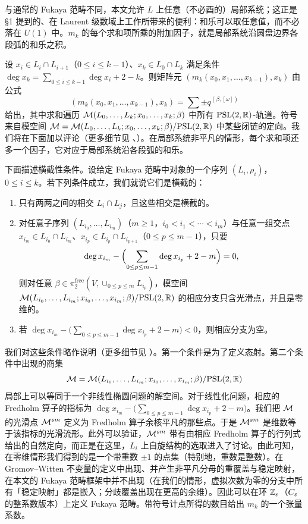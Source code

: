 \begin{yizhu}[局部系统与和乐因子]
与通常的 Fukaya 范畴不同，本文允许 $L$ 上任意（不必酉的）局部系统；这正是 \S1 提到的、在 Laurent 级数域上工作所带来的便利：和乐可以取任意值，而不必落在 $U(1)$ 中。$m_k$ 的每个求和项所乘的附加因子，就是局部系统沿圆盘边界各段弧的和乐之积。
\end{yizhu}

设 $x_i\in L_i\cap L_{i+1}$（$0\le i\le k-1$）、$x_k\in L_0\cap L_k$ 满足条件 $\deg x_k=\sum_{0\le i\le k-1}\deg x_i+2-k$。则矩阵元 $(m_k(x_0,x_1,\dots,x_{k-1}),x_k)$ 由公式
\[
  (m_k(x_0,x_1,\dots,x_{k-1}),x_k)=\sum\pm q^{(\beta,[\omega])}
\]
给出，其中求和遍历 $\mathcal{M}(L_0,\dots,L_k;x_0,\dots,x_k;\beta)$ 中所有 $\mathrm{PSL}(2,\mathbb{R})$-轨道。符号来自模空间 $\mathcal{M}=\mathcal{M}(L_0,\dots,L_k;x_0,\dots,x_k;\beta)/\mathrm{PSL}(2,\mathbb{R})$ 中某些闭链的定向。我们将在下面加以评论（更多细节见 \cite{Fu1}、\cite{FuOOO}）。在局部系统非平凡的情形，每个求和项还多一个因子，它对应于局部系统沿各段弧的和乐。

下面描述横截性条件。设给定 Fukaya 范畴中对象的一个序列 $(L_i,\rho_i)$，$0\le i\le k$。若下列条件成立，我们就说它们是横截的：
\begin{enumerate}[label=\arabic*),leftmargin=2.2em,itemsep=2pt,topsep=3pt]
\item 只有两两之间的相交 $L_i\cap L_j$，且这些相交是横截的。
\item 对任意子序列 $(L_{i_0},\dots,L_{i_m})$（$m\ge1$，$i_0<i_1<\cdots<i_m$）与任意一组交点 $x_{i_m}\in L_{i_0}\cap L_{i_m}$、$x_{i_p}\in L_{i_p}\cap L_{i_{p+1}}$（$0\le p\le m-1$），只要
\[
  \deg x_{i_m}-\Bigl(\sum_{0\le p\le m-1}\deg x_{i_p}+2-m\Bigr)=0,
\]
则对任意 $\beta\in\pi_2^{\mathrm{free}}(V,\cup_{0\le p\le m}L_{i_p})$，模空间 $\mathcal{M}(L_{i_0},\dots,L_{i_m};x_{i_0},\dots,x_{i_m};\beta)/\mathrm{PSL}(2,\mathbb{R})$ 的相应分支只含光滑点，并且是零维的。
\item 若 $\deg x_{i_m}-\bigl(\sum_{0\le p\le m-1}\deg x_{i_p}+2-m\bigr)<0$，则相应分支为空。
\end{enumerate}

我们对这些条件略作说明（更多细节见 \cite{FuOOO}）。第一个条件是为了定义态射。第二个条件中出现的商集
\[
  \mathcal{M}=\mathcal{M}(L_{i_0},\dots,L_{i_m};x_{i_0},\dots,x_{i_m};\beta)/\mathrm{PSL}(2,\mathbb{R})
\]
局部上可以等同于一个非线性椭圆问题的解空间。对于线性化问题，相应的 Fredholm 算子的指标为 $\deg x_{i_m}-\bigl(\sum_{0\le p\le m-1}\deg x_{i_p}+2-m\bigr)$。我们把 $\mathcal{M}$ 的光滑点 $\mathcal{M}^{sm}$ 定义为 Fredholm 算子余核平凡的那些点。于是 $\mathcal{M}^{sm}$ 是维数等于该指标的光滑流形。此外可以验证，$\mathcal{M}^{sm}$ 带有由相应 Fredholm 算子的行列式给出的自然定向，而正是在这里，$L_i$ 上自旋结构的选取进入了讨论。由此可知，在零维情形我们得到的是一个带重数 $\pm1$ 的点集（特别地，重数是整数）。在 Gromov--Witten 不变量的定义中出现、并产生非平凡分母的重覆盖与稳定映射，在本文的 Fukaya 范畴框架中并不出现（在我们的情形，虚拟次数为零的分支中所有「稳定映射」都是嵌入；分歧覆盖出现在更高的余维）。因此可以在环 $\mathbb{Z}_\varepsilon$（$C_{\varepsilon}$ 的整系数版本）上定义 Fukaya 范畴。带符号计点所得的数目给出 $m_k$ 的一个张量系数。

